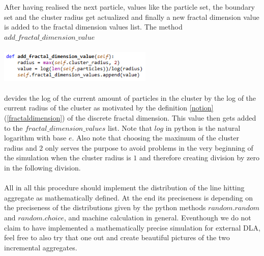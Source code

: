 \documentclass[12pt,a4paper]{scrartcl}
\numberwithin{equation}{subsection}
\newcommand{\1}{\mathbbm{1}}
\numberwithin{equation}{section}
\theoremstyle{definition}
\begin{document}
After having realised the next particle, values like the particle set, the boundary set and the cluster radius get actualized and finally a new fractal dimension value is added to the fractal dimension values list. The method $\mathit{add\_fractal\_dimension\_value}$ \\
\\
\includegraphics[height=1.5cm]{images/code-snippets/fractaldimension.png} \\
\\
devides the log of the current amount of particles in the cluster by the log of the current radius of the cluster as motivated by the definition \ref{notion} (\ref{fractaldimension}) of the discrete fractal dimension. This value then gets added to the $\mathit{fractal\_dimension\_values}$ list. Note that $\mathit{log}$ in python is the natural logarithm with base $e$. Also note that choosing the maximum of the cluster radius and $2$ only serves the purpose to avoid problems in the very beginning of the simulation when the cluster radius is $1$ and therefore creating division by zero in the following division.\\
\\All in all this procedure should implement the distribution of the line hitting aggregate as mathematically defined. At the end its preciseness is depending on the preciseness of the distributions given by the python methods $\mathit{random.random}$ and $\mathit{random.choice}$, and machine calculation in general. Eventhough we do not claim to have implemented a mathematically precise simulation for external DLA, feel free to also try that one out and create beautiful pictures of the two incremental aggregates. 

\newpage
\end{document}
